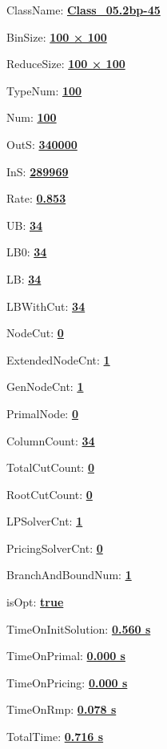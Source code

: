 \documentclass[11pt]{article}
\begin{document}
\pagestyle{empty}


ClassName: \underline{\textbf{Class_05.2bp-45}}
\par
BinSize: \underline{\textbf{100 × 100}}
\par
ReduceSize: \underline{\textbf{100 × 100}}
\par
TypeNum: \underline{\textbf{100}}
\par
Num: \underline{\textbf{100}}
\par
OutS: \underline{\textbf{340000}}
\par
InS: \underline{\textbf{289969}}
\par
Rate: \underline{\textbf{0.853}}
\par
UB: \underline{\textbf{34}}
\par
LB0: \underline{\textbf{34}}
\par
LB: \underline{\textbf{34}}
\par
LBWithCut: \underline{\textbf{34}}
\par
NodeCut: \underline{\textbf{0}}
\par
ExtendedNodeCnt: \underline{\textbf{1}}
\par
GenNodeCnt: \underline{\textbf{1}}
\par
PrimalNode: \underline{\textbf{0}}
\par
ColumnCount: \underline{\textbf{34}}
\par
TotalCutCount: \underline{\textbf{0}}
\par
RootCutCount: \underline{\textbf{0}}
\par
LPSolverCnt: \underline{\textbf{1}}
\par
PricingSolverCnt: \underline{\textbf{0}}
\par
BranchAndBoundNum: \underline{\textbf{1}}
\par
isOpt: \underline{\textbf{true}}
\par
TimeOnInitSolution: \underline{\textbf{0.560 s}}
\par
TimeOnPrimal: \underline{\textbf{0.000 s}}
\par
TimeOnPricing: \underline{\textbf{0.000 s}}
\par
TimeOnRmp: \underline{\textbf{0.078 s}}
\par
TotalTime: \underline{\textbf{0.716 s}}
\par
\newpage


\end{document}

